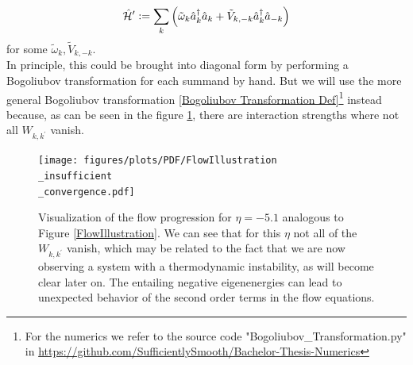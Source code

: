 \begin{equation}
\hat{\mathcal{H}}^\prime \vcentcolon= \sum\limits_{k}\left(\tilde\omega_k \hat a^\dagger_k\hat a_k + \tilde V_{k,-k}\hat a^\dagger_k\hat a_{-k}\right)
\end{equation}
for some $\tilde\omega_k,\tilde V_{k,-k}$.\\
In principle, this could be brought into diagonal form by performing a Bogoliubov transformation for each summand by hand. But we will use the more general Bogoliubov transformation \ref{Bogoliubov Transformation Def}\footnote{For the numerics we refer to the source code "Bogoliubov\_Transformation.py" in \url{https://github.com/SufficientlySmooth/Bachelor-Thesis-Numerics}} instead because, as can be seen in the figure \ref{FlowIllustrationInsufficient}, there are interaction strengths where not all $W_{k,k^\prime}$ vanish.
\begin{figure}[H]
    \centering
    \texttt{[image: figures/plots/PDF/FlowIllustration\\\_insufficient\\\_convergence.pdf]}
    \caption[Flow Visualization for $\eta=-5.1$]{Visualization of the flow progression for $\eta=-5.1$ analogous to Figure \ref{FlowIllustration}. We can see that for this $\eta$ not all of the $W_{k,k^\prime}$ vanish, which may be related to the fact that we are now observing a system with a thermodynamic instability, as will become clear later on. The entailing negative eigenenergies can lead to unexpected behavior of the second order terms in the flow equations.}
    \label{FlowIllustrationInsufficient}
\end{figure}

